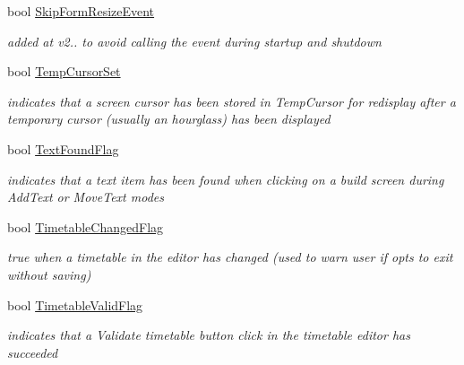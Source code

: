 \begin{DoxyCompactItemize}
\mbox{\label{class_t_interface_aa1df099695b33df73ef815751d426a50}} 
bool \mbox{\hyperlink{class_t_interface_aa1df099695b33df73ef815751d426a50}{Skip\+Form\+Resize\+Event}}
\begin{DoxyCompactList}\small\item\em added at v2.. to avoid calling the event during startup and shutdown \end{DoxyCompactList}\item 
\mbox{\label{class_t_interface_a069490da193b0cd917842b07dbd1b145}} 
bool \mbox{\hyperlink{class_t_interface_a069490da193b0cd917842b07dbd1b145}{Temp\+Cursor\+Set}}
\begin{DoxyCompactList}\small\item\em indicates that a screen cursor has been stored in Temp\+Cursor for redisplay after a temporary cursor (usually an hourglass) has been displayed \end{DoxyCompactList}\item 
\mbox{\label{class_t_interface_a22cc2e8a912114628025f065d43d699c}} 
bool \mbox{\hyperlink{class_t_interface_a22cc2e8a912114628025f065d43d699c}{Text\+Found\+Flag}}
\begin{DoxyCompactList}\small\item\em indicates that a text item has been found when clicking on a build screen during \textquotesingle{}Add\+Text\textquotesingle{} or \textquotesingle{}Move\+Text\textquotesingle{} modes \end{DoxyCompactList}\item 
\mbox{\label{class_t_interface_a1cf45c2ae9952b143d022ed2b46fa2fd}} 
bool \mbox{\hyperlink{class_t_interface_a1cf45c2ae9952b143d022ed2b46fa2fd}{Timetable\+Changed\+Flag}}
\begin{DoxyCompactList}\small\item\em true when a timetable in the editor has changed (used to warn user if opts to exit without saving) \end{DoxyCompactList}\item 
\mbox{\label{class_t_interface_a37aeb05f6d0f1cb639e31e5c8467cadd}} 
bool \mbox{\hyperlink{class_t_interface_a37aeb05f6d0f1cb639e31e5c8467cadd}{Timetable\+Valid\+Flag}}
\begin{DoxyCompactList}\small\item\em indicates that a \textquotesingle{}Validate timetable\textquotesingle{} button click in the timetable editor has succeeded \end{DoxyCompactList}\item 

\end{DoxyCompactItemize}
